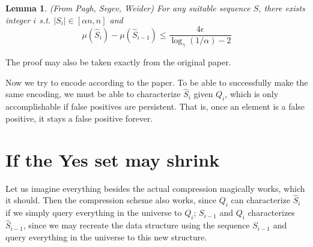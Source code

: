 \documentclass{article}
\newtheorem{lemma}{Lemma}
\begin{document}
\begin{lemma}
(From Pagh, Segev, Weider) For any suitable sequence $S$, there exists integer $i$ s.t. $|S_i| \in [\alpha n,n]$ and
$$\mu(\hat{S}_i) - \mu(\hat{S}_{i-1}) \leqslant \frac{4\epsilon}{\log_\gamma(1/\alpha)-2}$$
\end{lemma}
The proof may also be taken exactly from the original paper.

Now we try to encode according to the paper. To be able to successfully make the same encoding, we must be able to characterize $\hat{S}_i$ given $Q_i$, which is only accomplishable if false positives are persistent. That is, once an element is a false positive, it stays a false positive forever.

\section*{If the Yes set may shrink}
Let us imagine everything besides the actual compression magically works, which it should. Then the compression scheme also works, since $Q_i$ can characterize $\hat{S}_i$ if we simply query everything in the universe to $Q_i$; $S_{i-1}$ and $Q_i$ characterizes $\hat{S}_{i-1}$, since we may recreate the data structure using the sequence $S_{i-1}$ and query everything in the universe to this new structure.
\end{document}
